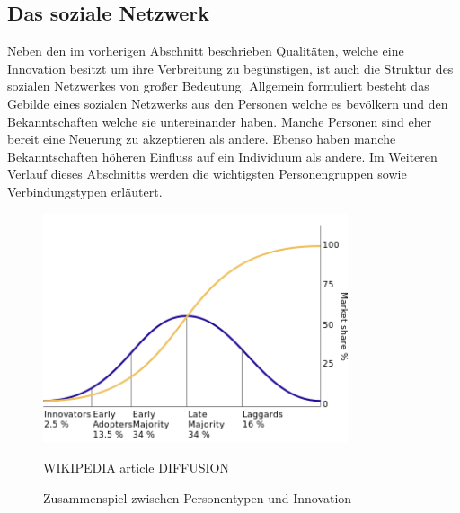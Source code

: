 \documentclass[12pt]{article}
\begin{document}
\subsection{Das soziale Netzwerk}
Neben den im vorherigen Abschnitt beschrieben Qualitäten, welche eine Innovation besitzt um ihre Verbreitung zu begünstigen, ist auch die Struktur des sozialen Netzwerkes von großer Bedeutung. Allgemein formuliert besteht das Gebilde eines sozialen Netzwerks aus den Personen welche es bevölkern und den Bekanntschaften welche sie untereinander haben. Manche Personen sind eher bereit eine Neuerung zu akzeptieren als andere. Ebenso haben manche Bekanntschaften höheren Einfluss auf ein Individuum als andere. Im Weiteren Verlauf dieses Abschnitts werden die wichtigsten Personengruppen sowie Verbindungstypen erläutert.
\begin{figure}
  \begin{center}
    \includegraphics[width=0.80\textwidth]{pic_diffusion.png}
  \end{center}
  \caption{Zusammenspiel zwischen Personentypen und Innovation}
  WIKIPEDIA article DIFFUSION
  \label{pic_diffusion}
\end{figure}
\end{document}
